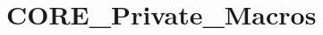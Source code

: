 \hypertarget{group___c_o_r_e___private___macros}{}\section{C\+O\+R\+E\+\_\+\+Private\+\_\+\+Macros}
\label{group___c_o_r_e___private___macros}
